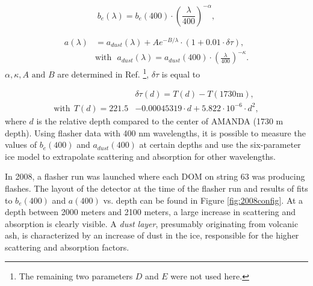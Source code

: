 \begin{equation}
b_e(\lambda)  = b_e(400) \cdot \left( \frac{\lambda}{400}\right)^{-\alpha},
\end{equation}

\begin{equation}
\begin{split}
a(\lambda) &= a_{dust}(\lambda) + A e^{-B/\lambda} \cdot (1+0.01 \cdot \delta \tau), \\
&\textrm{with} \ \ \ a_{dust}(\lambda) = a_{dust}(400) \cdot \left( \frac{\lambda}{400}\right)^{-\kappa}.
\end{split}
\end{equation}
$\alpha, \kappa, A \textrm{ and } B$ are determined in Ref. \cite{Ackermann:2006pva}\footnote{The remaining two parameters $D$ and $E$ were not used here.}, $\delta \tau$ is equal to

\begin{equation}
\begin{split}
&\delta \tau(d) = T(d) - T(1730 \textrm{m}), \\ 
\textrm{with} \ \ T(d) = 221.5 &- 0.00045319 \cdot d + 5.822 \cdot 10^{-6} \cdot d^2,
\end{split}
\end{equation}
where $d$ is the relative depth compared to the center of AMANDA (1730 m depth). Using flasher data with 400 nm wavelengths, it is possible to measure the values of $b_e(400)$ and $a_{dust}(400)$ at certain depths and use the six-parameter ice model to extrapolate scattering and absorption for other wavelengths. 

In 2008, a flasher run was launched where each DOM on string 63 was producing flashes. The layout of the detector at the time of the flasher run and results of fits to $b_{e}(400)$ and $a(400)$ vs. depth can be found in Figure \ref{fig:2008config}. At a depth between 2000 meters and 2100 meters, a large increase in scattering and absorption is clearly visible. A \textit{dust layer}, presumably originating from volcanic ash, is characterized by an increase of dust in the ice, responsible for the higher scattering and absorption factors.

